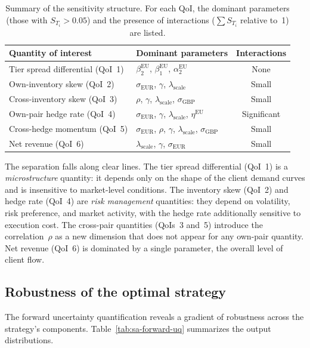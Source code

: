 \begin{table}[ht]
\centering
\caption{Summary of the sensitivity structure. For each QoI, the dominant parameters (those with $S_{T_i} > 0.05$) and the presence of interactions ($\sum S_{T_i}$ relative to~1) are listed.}
\label{tab:sa-summary}
\begin{tabular}{@{}llc@{}}
\toprule
Quantity of interest & Dominant parameters & Interactions \\
\midrule
Tier spread differential (QoI~1) & $\beta_2^{\text{EU}}$, $\beta_1^{\text{EU}}$, $\alpha_2^{\text{EU}}$ & None \\
Own-inventory skew (QoI~2) & $\sigma_{\text{EUR}}$, $\gamma$, $\lambda_{\text{scale}}$ & Small \\
Cross-inventory skew (QoI~3) & $\rho$, $\gamma$, $\lambda_{\text{scale}}$, $\sigma_{\text{GBP}}$ & Small \\
Own-pair hedge rate (QoI~4) & $\sigma_{\text{EUR}}$, $\gamma$, $\lambda_{\text{scale}}$, $\eta^{\text{EU}}$ & Significant \\
Cross-hedge momentum (QoI~5) & $\sigma_{\text{EUR}}$, $\rho$, $\gamma$, $\lambda_{\text{scale}}$, $\sigma_{\text{GBP}}$ & Small \\
Net revenue (QoI~6) & $\lambda_{\text{scale}}$, $\gamma$, $\sigma_{\text{EUR}}$ & Small \\
\bottomrule
\end{tabular}
\end{table}

The separation falls along clear lines. The tier spread differential (QoI~1) is a \emph{microstructure} quantity: it depends only on the shape of the client demand curves and is insensitive to market-level conditions. The inventory skew (QoI~2) and hedge rate (QoI~4) are \emph{risk management} quantities: they depend on volatility, risk preference, and market activity, with the hedge rate additionally sensitive to execution cost. The cross-pair quantities (QoIs~3 and~5) introduce the correlation~$\rho$ as a new dimension that does not appear for any own-pair quantity. Net revenue (QoI~6) is dominated by a single parameter, the overall level of client flow.


\subsection{Robustness of the optimal strategy}
\label{sec:sa-robustness}

The forward uncertainty quantification reveals a gradient of robustness across the strategy's components. Table~\ref{tab:sa-forward-uq} summarizes the output distributions.


